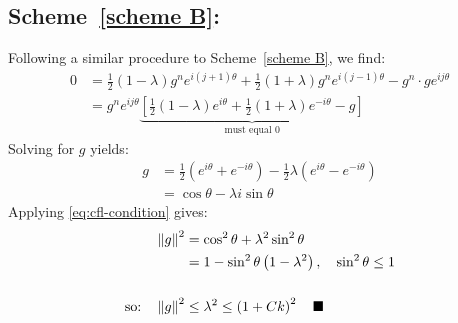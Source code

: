 \documentclass{hw_report}
\begin{document}
    \subsection*{Scheme~\ref{scheme B}:}
    Following a similar procedure to Scheme~\ref{scheme B}, we find:
    \begin{equation*}
        \begin{split}
            0 &= \frac{1}{2}(1-\lambda)g^{n}e^{i(j+1)\theta}+\frac{1}{2} (1+\lambda)g^{n}e^{i(j-1)\theta}-g^n\cdot g e^{ij\theta} \\
            &=g^n e^{ij\theta}\underbrace{\left[ \frac{1}{2}(1-\lambda)e^{i\theta}+\frac{1}{2}(1+\lambda)e^{-i\theta} -g \right]}_{\text{must equal 0}}
        \end{split}
    \end{equation*}
    Solving for $g$ yields:
    \begin{equation*}
        \begin{split}
            g&=\frac{1}{2}\left( e^{i\theta}+e^{-i\theta} \right)-\frac{1}{2}\lambda\left( e^{i\theta}-e^{-i\theta} \right)\\
            &=\cos \theta -\lambda i\sin \theta
        \end{split}
    \end{equation*}
    Applying \cref{eq:cfl-condition} gives:
    \begin{equation*}
        \begin{split}
            \left\| g \right\|^2 &= \cos^2\theta +\lambda ^2\sin ^2 \theta \\
            &=1-\sin ^2 \theta \left( 1-\lambda ^2 \right),\quad \sin^2 \theta \leq 1 \\ \\
            \text{so:}\quad \left\| g \right\|^2 &\leq \lambda^2 \leq \left( 1+Ck \right)^2 \quad \blacksquare
        \end{split}
    \end{equation*}
\end{document}
